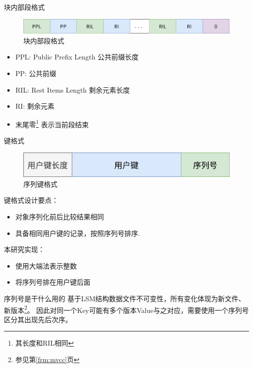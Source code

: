 \documentclass{beamer}
\begin{document}
\begin{frame}{块内部段格式}
    \begin{figure}
        \centering
        \includegraphics[width=1\linewidth]{pic/seg.png}
        \caption{块内部段格式}
    \end{figure}
    \begin{itemize}
        \item PPL: Public Prefix Length 公共前缀长度 
        \item PP: 公共前缀
        \item RIL: Rest Items Length 剩余元素长度
        \item RI: 剩余元素
        \item 末尾零\footnote{其长度和RIL相同} 表示当前段结束
    \end{itemize}
\end{frame}

\begin{frame}{键格式}
    \begin{figure}
        \centering
        \includegraphics[width=0.8\linewidth]{pic/seqkey.png}
        \caption{序列键格式}
    \end{figure}
    键格式设计要点：
    \begin{itemize}
        \item 对象序列化前后比较结果相同 
        \item 具备相同用户键的记录，按照序列号排序.
    \end{itemize}
    本研究实现：
    \begin{itemize}
        \item 使用大端法表示整数
        \item 将序列号排在用户键后面
    \end{itemize}
\end{frame}

\begin{frame}{序列号是干什么用的}
    基于LSM结构数据文件不可变性，所有变化体现为新文件、新版本\footnote{参见第\ref{frm:mvcc}页}。
    因此对同一个Key可能有多个版本Value与之对应，需要使用一个序列号区分其出现先后次序。
\end{frame}
\end{document}

